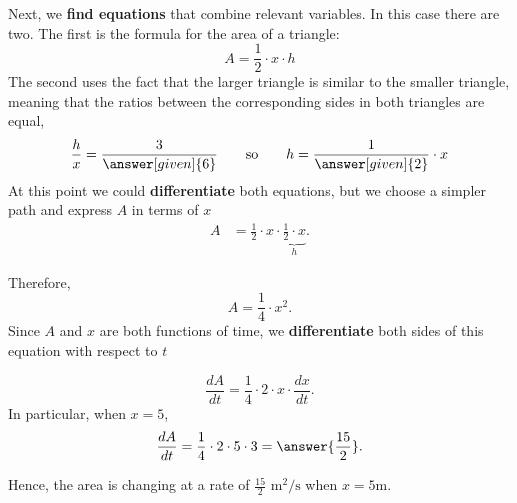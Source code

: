 \documentclass{ximera}
\begin{document}
\begin{example}
\begin{explanation}
			
			Next, we \textbf{find equations} that combine relevant
			variables. In this case there are two. The first is the formula
			for the area of a triangle:
			\[
			A = \frac{1}{2} \cdot x \cdot h
			\]
			The second uses the fact that the larger triangle is similar to
			the smaller triangle, meaning that the ratios between the corresponding sides in both triangles
			are equal,
			\[
			\frac{h}{x} = \frac{3}{\answer[given]{6}}\qquad\text{so}\qquad h =
			\frac{1}{\answer[given]{2}}\cdot x
			\]
			At this point we could \textbf{differentiate} both equations, but we 
			choose a simpler path and express  $A$ in terms of $x$  
			\begin{align*}
				A& = \frac{1}{2} \cdot x\cdot\underbrace{ \frac{1}{2}\cdot x}_{h} .
			\end{align*}
			
			Therefore,
			\[
			A=\frac{1}{4}\cdot x^2.
			\]
			Since $A$ and $x$ are both functions of time, we \textbf{differentiate} both sides of this equation with respect to $t$
			
			\[
			\frac{dA}{dt}=\frac{1}{4}\cdot2\cdot x\cdot\frac{dx}{dt}.
			\]
			In particular, when $x=5$, 
			\[
			\frac{dA}{dt}=\frac{1}{4}\cdot2\cdot 5\cdot 3=\answer{\frac{15}{2}}.
			\]
			
			Hence, the area is changing at a rate of $ \frac{15}{2}$ $\text{m}^2/\text{s}$ when $x=5$m.
			
		\end{explanation}
	\end{example}
\end{document}
